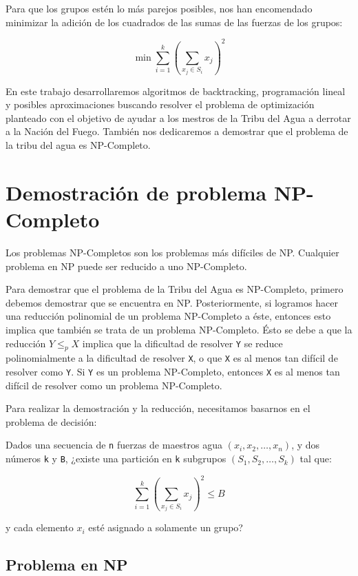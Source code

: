 \documentclass{article}
\begin{document}
Para que los grupos estén lo más parejos posibles, nos han encomendado minimizar la adición de los cuadrados de las sumas de las fuerzas de los grupos:

$$
\min \sum_{i=1}^{k} \left( \sum_{x_j \in S_i} x_j \right)^2
$$

En este trabajo desarrollaremos algoritmos de backtracking, programación lineal y posibles aproximaciones buscando resolver el problema de optimización planteado con el objetivo de ayudar a los mestros de la Tribu del Agua a derrotar a la Nación del Fuego. También nos dedicaremos a demostrar que el problema de la tribu del agua es NP-Completo.

\section{Demostración de problema NP-Completo}
\label{sec:np-completo}

Los problemas NP-Completos son los problemas más difíciles de NP. Cualquier problema en NP puede ser reducido a uno NP-Completo.

Para demostrar que el problema de la Tribu del Agua es NP-Completo, primero debemos demostrar que se encuentra en NP. Posteriormente, si logramos hacer una reducción polinomial de un problema NP-Completo a éste, entonces esto implica que también se trata de un problema NP-Completo. Ésto se debe a que la reducción $Y \leq_p X$ implica que la dificultad de resolver \texttt{Y} se reduce polinomialmente a la dificultad de resolver \texttt{X}, o que \texttt{X} es al menos tan difícil de resolver como \texttt{Y}. Si \texttt{Y} es un problema NP-Completo, entonces \texttt{X} es al menos tan difícil de resolver como un problema NP-Completo.

Para realizar la demostración y la reducción, necesitamos basarnos en el problema de decisión:

Dados una secuencia de \texttt{n} fuerzas de maestros agua $(x_i, x_2, \dots, x_n)$, y dos números \texttt{k} y \texttt{B}, ¿existe una partición en \texttt{k} subgrupos $(S_1, S_2, \dots, S_k)$ tal que:

$$
\sum_{i=1}^{k} \left( \sum_{x_j \in S_i} x_j \right)^2 \leq B
$$

y cada elemento $x_i$ esté asignado a solamente un grupo?
\subsection{Problema en NP}
\label{sec:taEnNp}
\end{document}
